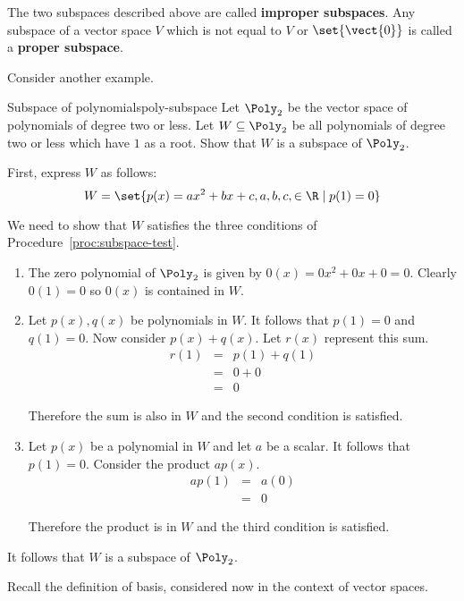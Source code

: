 The two subspaces described above are called \textbf{improper subspaces}. Any subspace of a vector space $V$ which is not equal to $V$ or  $\set{\vect{0} }$ is called a \textbf{proper subspace}. 

Consider another example.

\begin{example}{Subspace of polynomials}{poly-subspace}
Let $\Poly_2$ be the vector space of polynomials of degree two or less. Let $W \subseteq \Poly_2$ be all polynomials of degree two or less which have $1$ as a root. Show that $W$ is a subspace of $\Poly_2$. 
\end{example}

\begin{solution}
First, express $W$ as follows:
\[
W = \set{p(x) = ax^2 +bx +c, a,b,c, \in \R \mid p(1)  = 0 }
\]

We need to show that $W$ satisfies the three conditions of Procedure~\ref{proc:subspace-test}. 
\begin{enumerate}
\item
The zero polynomial of $\Poly_2$ is given by $0(x) = 0x^2 + 0x + 0 = 0$. Clearly $0(1) = 0$ so $0(x)$ is contained in $W$. 

\item
Let $p(x), q(x)$ be polynomials in $W$.  It follows that $p(1) = 0 $ and $q(1) = 0$. Now consider $p(x) + q(x)$. Let $r(x)$ represent this sum.
\begin{eqnarray*}
r(1) &=& p(1) + q(1) \\
&=& 0 + 0 \\
&=& 0
\end{eqnarray*}

Therefore the sum is also in $W$ and the second condition is satisfied. 

\item
Let $p(x)$ be a polynomial in $W$ and let $a$ be a scalar. It follows that $p(1) = 0$. Consider the product $ap(x)$. 
\begin{eqnarray*}
ap(1) &=& a(0) \\
&=& 0
\end{eqnarray*}

Therefore the product is in $W$ and the third condition is satisfied.
\end{enumerate}

It follows that $W$ is a subspace of $\Poly_2$. 
\end{solution} 

Recall the definition of basis, considered now in the context of vector spaces.

